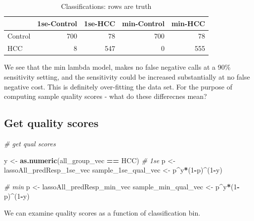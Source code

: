 \documentclass[
]{book}
\newenvironment{Shaded}{\begin{snugshade}}{\end{snugshade}}
\newcommand{\CommentTok}[1]{\textcolor[rgb]{0.56,0.35,0.01}{\textit{#1}}}
\newcommand{\DecValTok}[1]{\textcolor[rgb]{0.00,0.00,0.81}{#1}}
\newcommand{\KeywordTok}[1]{\textcolor[rgb]{0.13,0.29,0.53}{\textbf{#1}}}
\newcommand{\NormalTok}[1]{#1}
\newcommand{\OperatorTok}[1]{\textcolor[rgb]{0.81,0.36,0.00}{\textbf{#1}}}
\newcommand{\StringTok}[1]{\textcolor[rgb]{0.31,0.60,0.02}{#1}}
\begin{document}
\begin{table}

\caption{\label{tab:get-sample-class}Classifications: rows are truth}
\centering
\begin{tabular}[t]{l|r|r|r|r}
\hline
  & 1se-Control & 1se-HCC & min-Control & min-HCC\\
\hline
Control & 700 & 78 & 700 & 78\\
\hline
HCC & 8 & 547 & 0 & 555\\
\hline
\end{tabular}
\end{table}

We see that the min lambda model, makes no false negative calls at a 90\% sensitivity
setting, and the sensitivity could be increased substantially at no false negative
cost. This is definitely over-fitting the data set. For the purpose
of computing sample quality scores - what do these differecnes mean?

\hypertarget{get-quality-scores}{%
\subsection*{Get quality scores}\label{get-quality-scores}}

\begin{Shaded}
\begin{Highlighting}[]
\CommentTok{\# get qual scores}

\NormalTok{y <{-}}\StringTok{ }\KeywordTok{as.numeric}\NormalTok{(all\_group\_vec }\OperatorTok{==}\StringTok{ \textquotesingle{}HCC\textquotesingle{}}\NormalTok{)}
\CommentTok{\# 1se}
\NormalTok{p <{-}}\StringTok{ }\NormalTok{lassoAll\_predResp\_1se\_vec}
\NormalTok{sample\_1se\_qual\_vec <{-}}\StringTok{ }\NormalTok{p}\OperatorTok{\^{}}\NormalTok{y}\OperatorTok{*}\NormalTok{(}\DecValTok{1}\OperatorTok{{-}}\NormalTok{p)}\OperatorTok{\^{}}\NormalTok{(}\DecValTok{1}\OperatorTok{{-}}\NormalTok{y)}

\CommentTok{\# min}
\NormalTok{p <{-}}\StringTok{ }\NormalTok{lassoAll\_predResp\_min\_vec}
\NormalTok{sample\_min\_qual\_vec <{-}}\StringTok{ }\NormalTok{p}\OperatorTok{\^{}}\NormalTok{y}\OperatorTok{*}\NormalTok{(}\DecValTok{1}\OperatorTok{{-}}\NormalTok{p)}\OperatorTok{\^{}}\NormalTok{(}\DecValTok{1}\OperatorTok{{-}}\NormalTok{y)}
\end{Highlighting}
\end{Shaded}

We can examine quality scores as a function of classification bin.
\end{document}
